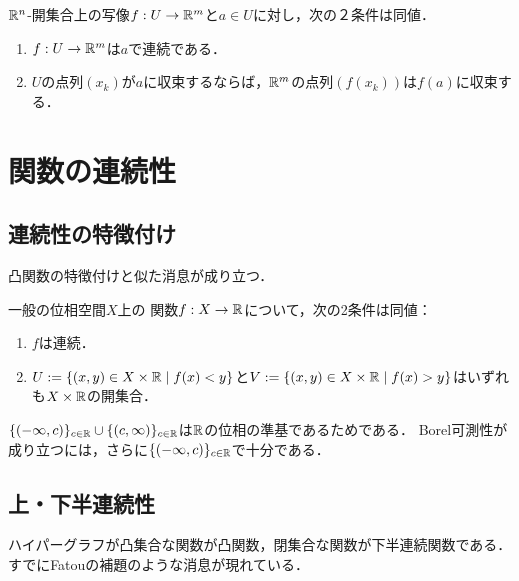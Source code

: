 \documentclass[uplatex,dvipdfmx]{jsreport}
\begin{document}
\begin{proposition}[連続写像の点列による特徴付け]
    $\mathbb{R}^n$-開集合上の写像$f:U\to\mathbb{R}^m$と$a\in U$に対し，次の２条件は同値．
    \begin{enumerate}
        \item $f:U\to\mathbb{R}^m$は$a$で連続である．
        \item $U$の点列$(x_k)$が$a$に収束するならば，$\mathbb{R}^m$の点列$(f(x_k))$は$f(a)$に収束する．
    \end{enumerate}
\end{proposition}

\section{関数の連続性}

\subsection{連続性の特徴付け}

\begin{tcolorbox}[colframe=ForestGreen, colback=ForestGreen!10!white,breakable,colbacktitle=ForestGreen!40!white,coltitle=black,fonttitle=\bfseries\sffamily,
title=]
    凸関数の特徴付けと似た消息が成り立つ．
\end{tcolorbox}

\begin{proposition}
    一般の位相空間$X$上の
    関数$f:X\to\mathbb{R}$について，次の2条件は同値：
    \begin{enumerate}
        \item $f$は連続．
        \item $U:=\left\{(x,y)\in X\times\mathbb{R}\mid f(x)<y\right\}$と$V:=\left\{(x,y)\in X\times\mathbb{R}\mid f(x)>y\right\}$はいずれも$X\times\mathbb{R}$の開集合．
    \end{enumerate}
\end{proposition}
\begin{Proof}
    $\{(-\infty,c)\}_{c\in\mathbb{R}}\cup\{(c,\infty)\}_{c\in\mathbb{R}}$は$\mathbb{R}$の位相の準基であるためである．
    Borel可測性が成り立つには，さらに$\{(-\infty,c)\}_{c\in\mathbb{R}}$で十分である．
\end{Proof}

\subsection{上・下半連続性}

\begin{tcolorbox}[colframe=ForestGreen, colback=ForestGreen!10!white,breakable,colbacktitle=ForestGreen!40!white,coltitle=black,fonttitle=\bfseries\sffamily,
title=]
    ハイパーグラフが凸集合な関数が凸関数，閉集合な関数が下半連続関数である．
    すでにFatouの補題のような消息が現れている．
\end{tcolorbox}
\end{document}

